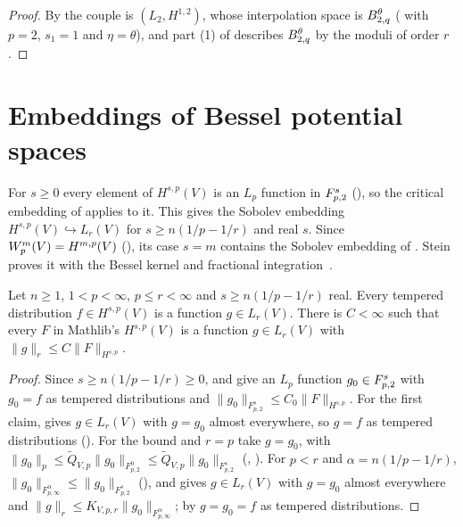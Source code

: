 \begin{proof}
\leanok
By  the couple is $(L_2, H^{1,2})$, whose interpolation space is
$B^{\theta}_{2,q}$ ( with $p = 2$, $s_1 = 1$ and
$\eta = \theta$), and part (1) of  describes $B^{\theta}_{2,q}$ by the moduli
of order $r$.
\end{proof}

\section{Embeddings of Bessel potential spaces}
\label{sec:bessel-potential-embedding}

For $s \geq 0$ every element of $H^{s,p}(V)$ is an $L_p$ function in $F^{s}_{p,2}$
(), so the critical embedding of
 applies to it. This gives the Sobolev embedding
$H^{s,p}(V) \hookrightarrow L_r(V)$ for $s \geq n(1/p - 1/r)$ and real $s$. Since
$W^{m}_{p}(V) = H^{m,p}(V)$ (), its case $s = m$ contains the Sobolev
embedding of . Stein proves it with the Bessel kernel and
fractional integration~\cite[Chapter~V]{SteinSingular}.

\begin{theorem}[$H^{s,p} \hookrightarrow L_r$]
\label{thm:bessel-potential-embedding}
\leanok
{}
Let $n \geq 1$, $1 < p < \infty$, $p \leq r < \infty$ and $s \geq n(1/p - 1/r)$ real. Every
tempered distribution $f \in H^{s,p}(V)$ is a function $g \in L_r(V)$. There is $C < \infty$ such
that every $F$ in Mathlib's $H^{s,p}(V)$ is a function $g \in L_r(V)$ with
$\|g\|_r \leq C \|F\|_{H^{s,p}}$.
\end{theorem}

\begin{proof}
\leanok
Since $s \geq n(1/p - 1/r) \geq 0$,  and
 give an $L_p$ function $g_0 \in F^{s}_{p,2}$ with $g_0 = f$ as
tempered distributions and $\|g_0\|_{F^s_{p,2}} \leq C_0 \|F\|_{H^{s,p}}$. For the first
claim,  gives $g \in L_r(V)$ with $g = g_0$ almost
everywhere, so $g = f$ as tempered distributions ().
For the bound and $r = p$ take
$g = g_0$, with $\|g_0\|_p \leq \tilde Q_{V,p} \|g_0\|_{F^0_{p,2}}
\leq \tilde Q_{V,p} \|g_0\|_{F^s_{p,2}}$ (,
). For $p < r$ and $\alpha = n(1/p - 1/r)$,
$\|g_0\|_{F^\alpha_{p,\infty}} \leq \|g_0\|_{F^s_{p,2}}$ (), and
 gives $g \in L_r(V)$ with $g = g_0$ almost everywhere and
$\|g\|_r \leq K_{V,p,r} \|g_0\|_{F^\alpha_{p,\infty}}$; by
 $g = g_0 = f$ as tempered distributions.
\end{proof}

